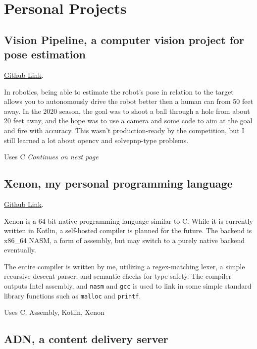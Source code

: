 \documentclass[10pt,letterpaper]{article}
\def\link#1#2{\color{blue!60!black}\href{#1}{#2}\color{black}}
\newcommand{\CPP}
{C\nolinebreak[4]\hspace{-.05em}\raisebox{.35ex}{\footnotesize\bf ++}}
\def\code#1{\texttt{#1}}
\begin{document}
    \section*{Personal Projects}

    \subsection*{Vision Pipeline, a computer vision project for pose estimation}
    \link{https://github.com/CougarProgramming623/vision-pipeline}{Github Link}. 
    
    In robotics, being able to estimate the robot's pose in relation to the target
    allows you to autonomously drive the robot better then a human can from 50 feet away.
    In the 2020 season, the goal was to shoot a ball through a hole from about 20 feet away,
    and the hope was to use a camera and some code to aim at the goal and fire with accuracy.
    This wasn't production-ready by the competition,
    but I still learned a lot about opencv and solvepnp-type problems. 

    \vspace{0.5em}
    \noindent Uses \CPP
    \hspace*{0pt}\hfill\textit{Continues on next page}

    \subsection*{Xenon, my personal programming language}
    \link{https://github.com/Mee42/Xenon}{Github Link}.
    
    Xenon is a 64 bit native programming language similar to C.
    While it is currently written in Kotlin, a self-hosted compiler is planned for the future.
    The backend is x86\_64 NASM, a form of assembly,
    but may switch to a purely native backend eventually.
    
    The entire compiler is written by me, utilizing a regex-matching lexer, 
    a simple recursive descent parser,
    and semantic checks for type safety.
    The compiler outputs Intel assembly,
    and \code{nasm} and \code{gcc} is used to link in some simple standard library functions such as
    \code{malloc} and \code{printf}.
    
    \vspace{0.5em}
    \noindent Uses C, Assembly, Kotlin, Xenon

    \subsection*{ADN, a content delivery server}
    
\end{document}
